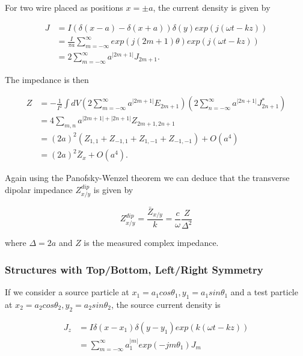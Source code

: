 For two wire placed as positions $x = \pm a$, the current density is given by \cite{Tsutsui:OnSingleWire}

\begin{align}
J & =  I \left( \delta \left( x - a \right) - \delta \left( x + a  \right) \right) \delta (y) exp \left( j \left( \omega t - kz \right) \right) \nonumber \\
& =  \frac{I}{\pi a} \displaystyle\sum\limits_{m=-\infty}^{\infty} exp \left(j \left( 2m +1 \right) \theta \right) exp \left( j \left( \omega t - kz \right) \right) \nonumber \\
& =  2\displaystyle\sum\limits_{m=-\infty}^{\infty} a^{|2m + 1 |} J_{2m + 1}.
\end{align}

The impedance is then

\begin{align}
Z & =  - \frac{1}{I^{2}} \int dV \left( 2\displaystyle\sum\limits_{m=-\infty}^{\infty} a^{|2m + 1 |} E_{2m + 1}  \right)  \left( 2\displaystyle\sum\limits_{n=-\infty}^{\infty} a^{|2n + 1 |} J_{2n + 1}^{*}  \right) \nonumber \\
& =  4 \displaystyle\sum\limits_{m,n} a^{|2m + 1 | + |2n + 1|} Z_{2m + 1, 2n+1} \nonumber \\
& =  \left(2a \right)^{2}\left( Z_{1,1} + Z_{-1,1} + Z_{1,-1} + Z_{-1,-1} \right) + O(a^{4}) \nonumber \\
& =  (2a)^{2}\bar{Z}_{x} + O(a^{4}). 
\end{align}

Again using the Panofsky-Wenzel theorem we can deduce that the transverse dipolar impedance $Z^{dip}_{x/y}$ is given by 

\begin{equation}
Z^{dip}_{x/y} = \frac{\bar{Z}_{x/y}}{k} = \frac{c}{\omega} \frac{Z}{\Delta^{2}}
\end{equation}

where $\Delta = 2a$ and $Z$ is the measured complex impedance.

\subsubsection{Structures with Top/Bottom, Left/Right Symmetry}

If we consider a source particle at $x_{1} = a_{1}cos\theta_{1}, y_{1} = a_{1}sin\theta_{1}$ and a test particle at $x_{2} = a_{2}cos\theta_{2}, y_{2} = a_{2}sin\theta_{2}$, the source current density is

\begin{align}
J_{z} &= I\delta \left( x-x_{1} \right) \delta \left( y-y_{1} \right) exp \left( k \left( \omega t - kz \right) \right) \nonumber \\
          &=\displaystyle\sum\limits_{m=-\infty}^{\infty}a_{1}^{|m|}exp\left( -jm\theta_{1} \right) J_{m}
\end{align}


